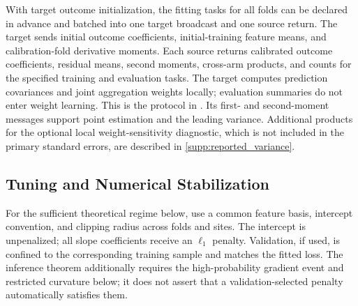 \documentclass[12pt]{article}
\begin{document}
With target outcome initialization, the fitting tasks for all folds can be declared in advance and batched into one target broadcast and one source return. The target sends initial outcome coefficients, initial-training feature means, and calibration-fold derivative moments. Each source returns calibrated outcome coefficients, residual means, second moments, cross-arm products, and counts for the specified training and evaluation tasks. The target computes prediction covariances and joint aggregation weights locally; evaluation summaries do not enter weight learning. This is the protocol in . Its first- and second-moment messages support point estimation and the leading variance. Additional products for the optional local weight-sensitivity diagnostic, which is not included in the primary standard errors, are described in \cref{supp:reported_variance}.

\subsection{Tuning and Numerical Stabilization}\label{sec:tuning}

For the sufficient theoretical regime below, use a common feature basis, intercept convention, and clipping radius across folds and sites. The intercept is unpenalized; all slope coefficients receive an $\ell_1$ penalty. Validation, if used, is confined to the corresponding training sample and matches the fitted loss. The inference theorem additionally requires the high-probability gradient event and restricted curvature below; it does not assert that a validation-selected penalty automatically satisfies them.
\end{document}

